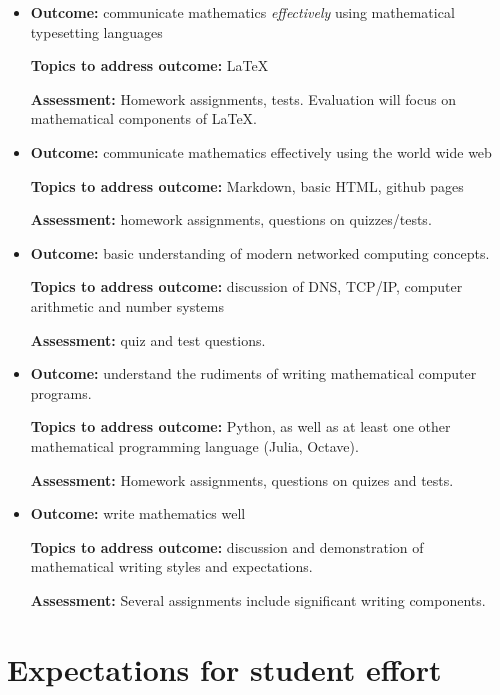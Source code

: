 \documentclass[12pt]{article}
\begin{document}
\begin{itemize}


\item \textbf{Outcome:} communicate mathematics \emph{effectively} using mathematical
typesetting languages

\textbf{Topics to address outcome:} \LaTeX

\textbf{Assessment:} Homework assignments, tests.  Evaluation will focus on
mathematical components of \LaTeX.


\item \textbf{Outcome:} communicate mathematics effectively using the world wide web

\textbf{Topics to address outcome:} Markdown, basic HTML, github pages

\textbf{Assessment:} homework assignments, questions on quizzes/tests.


\item \textbf{Outcome:} basic understanding of modern networked computing concepts.

\textbf{Topics to address outcome:} discussion of DNS, TCP/IP, computer arithmetic and number systems

\textbf{Assessment:} quiz and test questions.


\item \textbf{Outcome:} understand the rudiments of writing mathematical computer programs.

\textbf{Topics to address outcome:} Python, as well as at least one other mathematical programming language (Julia, Octave).

\textbf{Assessment:} Homework assignments, questions on quizes and tests.


\item \textbf{Outcome:} write mathematics well

\textbf{Topics to address outcome:} discussion and demonstration of mathematical writing styles and expectations.

\textbf{Assessment:} Several assignments include significant writing components.

\end{itemize}

\section*{Expectations for student effort}
\end{document}
